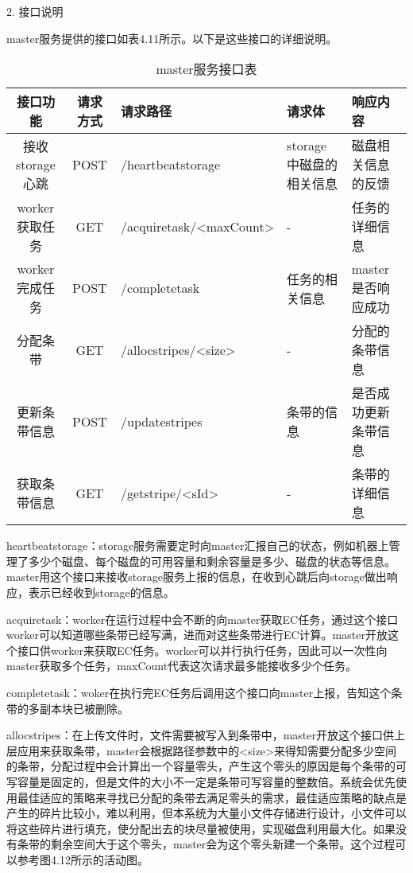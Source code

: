 2. 接口说明

master服务提供的接口如表4.11所示。以下是这些接口的详细说明。

\begin{table}[h]
  \centering
  \caption{master服务接口表}
  \begin{tabular}{ccp{2.5cm}p{2cm}p{3cm}}
    \toprule
    接口功能   & 请求方式    & 请求路径     & 请求体    & 响应内容                     \\
    \midrule
    接收storage心跳       & POST  & /heartbeatstorage                & storage中磁盘的相关信息   & 磁盘相关信息的反馈\\
    worker获取任务        & GET   & /acquiretask\newline/<maxCount>  & -                        & 任务的详细信息\\
    worker完成任务        & POST  & /completetask                    & 任务的相关信息            & master是否响应成功\\
    分配条带              & GET   & /allocstripes\newline/<size>     & -                        & 分配的条带信息\\
    更新条带信息          & POST  & /updatestripes                   & 条带的信息                & 是否成功更新条带信息\\
    获取条带信息          & GET   & /getstripe\newline/<sId>    & -                        & 条带的详细信息\\
    \bottomrule
  \end{tabular}
\end{table}	

heartbeatstorage：storage服务需要定时向master汇报自己的状态，例如机器上管理了多少个磁盘、每个磁盘的可用容量和剩余容量是多少、磁盘的状态等信息。master用这个接口来接收storage服务上报的信息，在收到心跳后向storage做出响应，表示已经收到storage的信息。

acquiretask：worker在运行过程中会不断的向master获取EC任务，通过这个接口worker可以知道哪些条带已经写满，进而对这些条带进行EC计算。master开放这个接口供worker来获取EC任务。worker可以并行执行任务，因此可以一次性向master获取多个任务，maxCount代表这次请求最多能接收多少个任务。

completetask：woker在执行完EC任务后调用这个接口向master上报，告知这个条带的多副本块已被删除。

allocstripes：在上传文件时，文件需要被写入到条带中，master开放这个接口供上层应用来获取条带，master会根据路径参数中的<size>来得知需要分配多少空间的条带，分配过程中会计算出一个容量零头，产生这个零头的原因是每个条带的可写容量是固定的，但是文件的大小不一定是条带可写容量的整数倍。系统会优先使用最佳适应的策略来寻找已分配的条带去满足零头的需求，最佳适应策略的缺点是产生的碎片比较小，难以利用，但本系统为大量小文件存储进行设计，小文件可以将这些碎片进行填充，使分配出去的块尽量被使用，实现磁盘利用最大化。如果没有条带的剩余空间大于这个零头，master会为这个零头新建一个条带。这个过程可以参考图4.12所示的活动图。

